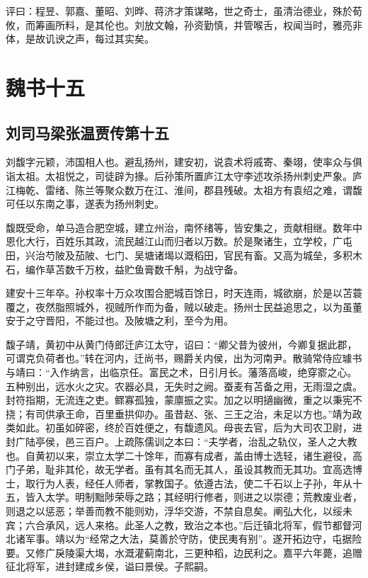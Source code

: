 \documentclass[12pt,UTF8]{ctexbook}
\begin{document}
评曰：程昱、郭嘉、董昭、刘晔、蒋济才策谋略，世之奇士，虽清治德业，殊於荀攸，而筹画所料，是其伦也。刘放文翰，孙资勤慎，并管喉舌，权闻当时，雅亮非体，是故讥谀之声，每过其实矣。

\part{魏书十五}
\chapter{刘司马梁张温贾传第十五}

刘馥字元颖，沛国相人也。避乱扬州，建安初，说袁术将戚寄、秦翊，使率众与俱诣太祖。太祖悦之，司徒辟为掾。后孙策所置庐江太守李述攻杀扬州刺史严象。庐江梅乾、雷绪、陈兰等聚众数万在江、淮间，郡县残破。太祖方有袁绍之难，谓馥可任以东南之事，遂表为扬州刺史。

馥既受命，单马造合肥空城，建立州治，南怀绪等，皆安集之，贡献相继。数年中恩化大行，百姓乐其政，流民越江山而归者以万数。於是聚诸生，立学校，广屯田，兴治芍陂及茄陂、七门、吴塘诸堨以溉稻田，官民有畜。又高为城垒，多积木石，编作草苫数千万枚，益贮鱼膏数千斛，为战守备。

建安十三年卒。孙权率十万众攻围合肥城百馀日，时天连雨，城欲崩，於是以苫蓑覆之，夜然脂照城外，视贼所作而为备，贼以破走。扬州士民益追思之，以为虽董安于之守晋阳，不能过也。及陂塘之利，至今为用。

馥子靖，黄初中从黄门侍郎迁庐江太守，诏曰：“卿父昔为彼州，今卿复据此郡，可谓克负荷者也。”转在河内，迁尚书，赐爵关内侯，出为河南尹。散骑常侍应璩书与靖曰：“入作纳言，出临京任。富民之术，日引月长。藩落高峻，绝穿窬之心。五种别出，远水火之灾。农器必具，无失时之阙。蚕麦有苫备之用，无雨湿之虞。封符指期，无流连之吏。鳏寡孤独，蒙廪振之实。加之以明擿幽微，重之以秉宪不挠；有司供承王命，百里垂拱仰办。虽昔赵、张、三王之治，未足以方也。”靖为政类如此。初虽如碎密，终於百姓便之，有馥遗风。母丧去官，后为大司农卫尉，进封广陆亭侯，邑三百户。上疏陈儒训之本曰：“夫学者，治乱之轨仪，圣人之大教也。自黄初以来，崇立太学二十馀年，而寡有成者，盖由博士选轻，诸生避役，高门子弟，耻非其伦，故无学者。虽有其名而无其人，虽设其教而无其功。宜高选博士，取行为人表，经任人师者，掌教国子。依遵古法，使二千石以上子孙，年从十五，皆入太学。明制黜陟荣辱之路；其经明行修者，则进之以崇德；荒教废业者，则退之以惩恶；举善而教不能则劝，浮华交游，不禁自息矣。阐弘大化，以绥未宾；六合承风，远人来格。此圣人之教，致治之本也。”后迁镇北将军，假节都督河北诸军事。靖以为“经常之大法，莫善於守防，使民夷有别”。遂开拓边守，屯据险要。又修广戾陵渠大堨，水溉灌蓟南北，三更种稻，边民利之。嘉平六年薨，追赠征北将军，进封建成乡侯，谥曰景侯。子熙嗣。
\end{document}
